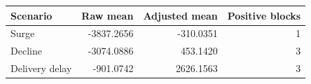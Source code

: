 \begin{tabular}{lrrr}
\toprule
Scenario & Raw mean & Adjusted mean & Positive blocks \\
\midrule
Surge & -3837.2656 & -310.0351 & 1 \\
Decline & -3074.0886 & 453.1420 & 3 \\
Delivery delay & -901.0742 & 2626.1563 & 3 \\
\bottomrule
\end{tabular}
